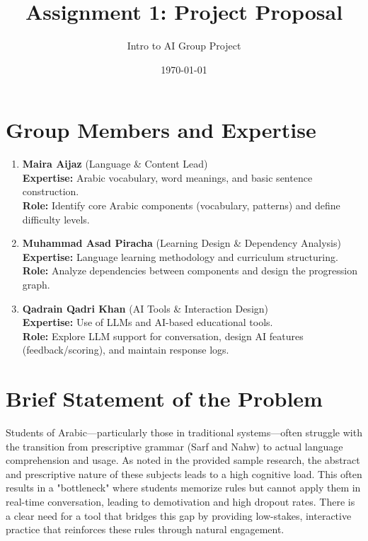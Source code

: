 \documentclass{article}
\title{\textbf{Assignment 1: Project Proposal}}
\author{Intro to AI Group Project}
\date{\today}
\begin{document}
\maketitle

\section*{Group Members and Expertise}

\begin{enumerate}[label=\textbf{Member \arabic*:}, leftmargin=2cm]
    \item \textbf{Maira Aijaz} (Language \& Content Lead) \\
    \textbf{Expertise:} Arabic vocabulary, word meanings, and basic sentence construction. \\
    \textbf{Role:} Identify core Arabic components (vocabulary, patterns) and define difficulty levels.

    \item \textbf{Muhammad Asad Piracha} (Learning Design \& Dependency Analysis) \\
    \textbf{Expertise:} Language learning methodology and curriculum structuring. \\
    \textbf{Role:} Analyze dependencies between components and design the progression graph.

    \item \textbf{Qadrain Qadri Khan} (AI Tools \& Interaction Design) \\
    \textbf{Expertise:} Use of LLMs and AI-based educational tools. \\
    \textbf{Role:} Explore LLM support for conversation, design AI features (feedback/scoring), and maintain response logs.
\end{enumerate}

\section{Brief Statement of the Problem}
Students of Arabic—particularly those in traditional systems—often struggle with the transition from prescriptive grammar (Sarf and Nahw) to actual language comprehension and usage. As noted in the provided sample research, the abstract and prescriptive nature of these subjects leads to a high cognitive load. This often results in a "bottleneck" where students memorize rules but cannot apply them in real-time conversation, leading to demotivation and high dropout rates. There is a clear need for a tool that bridges this gap by providing low-stakes, interactive practice that reinforces these rules through natural engagement.
\end{document}
